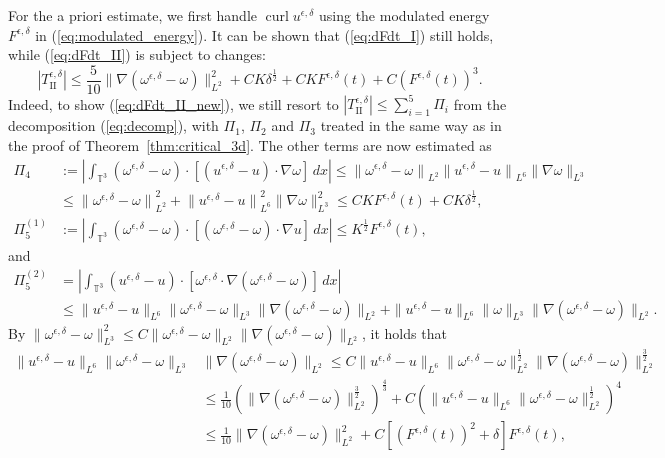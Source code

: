 \documentclass[reqno,10pt]{amsart}
\theoremstyle{definition}
\theoremstyle{remark}
\numberwithin{equation}{section}
\DeclareMathOperator{\curl}{curl}
\begin{document}
For the a priori estimate, we first handle $\curl u^{\epsilon,\delta}$ using the modulated energy $F^{\epsilon,\delta}$ in (\ref{eq:modulated_energy}). It can be shown that (\ref{eq:dFdt_I}) still holds, while (\ref{eq:dFdt_II}) is subject to changes:
\begin{equation} \label{eq:dFdt_II_new}
    |T^{\epsilon,\delta}_\text{II}| \le \frac{5}{10} \|\nabla(\omega^{\epsilon,\delta}-\omega)\|_{L^2}^2 + CK\delta^{\frac{1}{2}} + CKF^{\epsilon,\delta}(t) + C\left(F^{\epsilon,\delta}(t)\right)^3.
\end{equation}
Indeed, to show (\ref{eq:dFdt_II_new}), we still resort to $|T^{\epsilon,\delta}_\text{II}|\le \sum_{i=1}^5\Pi_i$ from the decomposition (\ref{eq:decomp}), with $\Pi_1$, $\Pi_2$ and $\Pi_3$ treated in the same way as in the proof of Theorem~\ref{thm:critical_3d}. The other terms are now estimated as
\[
\begin{aligned}
\Pi_4 &:= \left| \int_{\mathbb T^3} (\omega^{\epsilon,\delta}-\omega)\cdot \left[ (u^{\epsilon,\delta}-u)\cdot\nabla \omega \right] \,dx \right|
    \le {\|\omega^{\epsilon,\delta} -\omega\|}_{L^2} {\|u^{\epsilon,\delta}-u\|}_{L^6} \|\nabla \omega\|_{L^3} \\
    &\le {\|\omega^{\epsilon,\delta} -\omega\|}_{L^2}^2 + {\|u^{\epsilon,\delta}-u\|}_{L^6}^2 \|\nabla \omega\|_{L^3}^2
    \le CKF^{\epsilon,\delta}(t) + CK\delta^{\frac{1}{2}}, \\
    \Pi_5^{(1)} &:= \left| \int_{\mathbb T^3} (\omega^{\epsilon,\delta}-\omega)\cdot \left[ (\omega^{\epsilon,\delta}-\omega)\cdot \nabla u \right] \,dx \right| \le K^{\frac{1}{2}} F^{\epsilon,\delta}(t),
\end{aligned}
\]
and
\[ 
\begin{aligned}
   \Pi_{5}^{(2)} &= \left| \int_{\mathbb T^3} (u^{\epsilon,\delta}-u) \cdot \left[ \omega^{\epsilon,\delta} \cdot \nabla(\omega^{\epsilon,\delta}-\omega) \right] \,dx \right| \\
    &\le \|u^{\epsilon,\delta}-u\|_{L^6} \|\omega^{\epsilon,\delta}-\omega\|_{L^3} \|\nabla (\omega^{\epsilon,\delta}-\omega)\|_{L^2} + \|u^{\epsilon,\delta}-u\|_{L^6} \|\omega\|_{L^3} \|\nabla(\omega^{\epsilon,\delta}-\omega)\|_{L^2}.
\end{aligned}
\]
By $\|\omega^{\epsilon,\delta}-\omega\|_{L^3}^2 \le C \|\omega^{\epsilon,\delta}-\omega\|_{L^2} \|\nabla(\omega^{\epsilon,\delta}-\omega)\|_{L^2}$, it holds that
\[
\begin{aligned}
    \|u^{\epsilon,\delta}-u\|_{L^6} \|\omega^{\epsilon,\delta}-\omega\|_{L^3} &\|\nabla (\omega^{\epsilon,\delta}-\omega)\|_{L^2} \le C\|u^{\epsilon,\delta}-u\|_{L^6} \|\omega^{\epsilon,\delta}-\omega\|_{L^2}^{\frac{1}{2}} \|\nabla(\omega^{\epsilon,\delta}-\omega)\|_{L^2}^{\frac{3}{2}} \\
    &\le \frac{1}{10} \left( \|\nabla(\omega^{\epsilon,\delta}-\omega)\|_{L^2}^{\frac{3}{2}} \right)^{\frac{4}{3}} + C \left( \|u^{\epsilon,\delta}-u\|_{L^6} \|\omega^{\epsilon,\delta}-\omega\|_{L^2}^{\frac{1}{2}}\right)^4 \\
    &\le \frac{1}{10} \|\nabla(\omega^{\epsilon,\delta}-\omega)\|_{L^2}^2 + C\left[(F^{\epsilon,\delta}(t))^2+\delta \right] F^{\epsilon,\delta}(t),
\end{aligned}
\]
\end{document}
